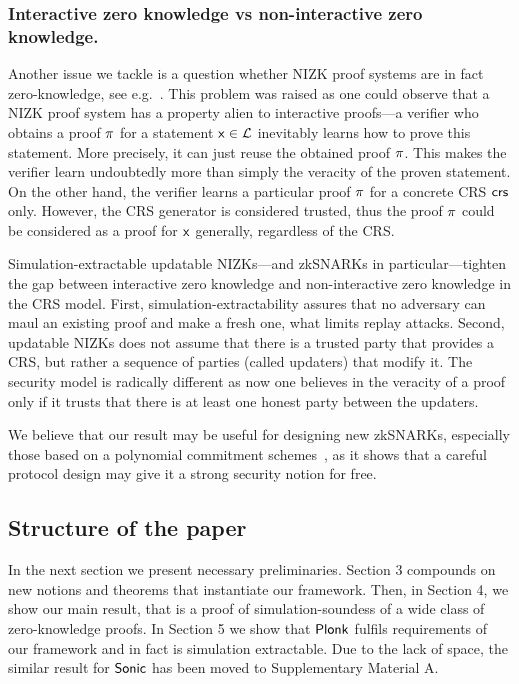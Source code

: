 \let\accentvec\vec \documentclass[runningheads]{llncs}
\begin{document}
\subsubsection{Interactive zero knowledge vs non-interactive zero knowledge.}
Another issue we tackle is a question whether NIZK proof systems are in
fact zero-knowledge, see e.g.~\cite{C:Pass03}. This problem was raised as one
could observe that a NIZK proof system has a property alien to interactive
proofs---a verifier who obtains a proof $\pi$ for a statement $\mathsf{x} \in
\mathcal{L}$ inevitably learns how to prove this statement. More precisely, it can
just reuse the obtained proof $\pi$. This makes the verifier learn
undoubtedly more than simply the veracity of the proven statement. On the other
hand, the verifier learns a particular proof $\pi$ for a concrete CRS
$\mathsf{crs}$ only. However, the CRS generator is considered trusted, thus the proof
$\pi$ could be considered as a proof for $\mathsf{x}$ generally, regardless of the
CRS.

Simulation-extractable updatable NIZKs---and zkSNARKs in particular---tighten
the gap between interactive zero knowledge and non-interactive zero knowledge in
the CRS model. First, simulation-extractability assures that no adversary can
maul an existing proof and make a fresh one, what limits replay attacks.
Second, updatable NIZKs does not assume that there is a trusted party that
provides a CRS, but rather a sequence of parties (called updaters) that modify
it. The security model is radically different as now one believes in the
veracity of a proof only if it trusts that there is at least one honest party
between the updaters. 

We believe that our result may be useful for designing new zkSNARKs, especially those based on a polynomial commitment schemes~\cite{AC:KatZavGol10}, as it shows that a careful protocol design may give it a strong security notion for free.

\subsection{Structure of the paper}
In the next section we present necessary preliminaries.
Section 3 compounds on new notions and theorems that instantiate our
framework. Then, in Section 4, we show our main result, that is a proof of
simulation-soundess of a wide class of zero-knowledge proofs. In Section 5 we
show that $\textnormal{\textsf{Plonk}}$ fulfils requirements of our framework and in fact is
simulation extractable. Due to the lack of space, the similar result for
${\textnormal{\textsf{Sonic}}}$ has been moved to Supplementary Material A.
\end{document}
